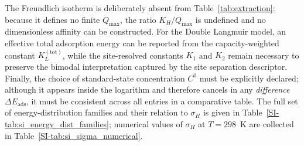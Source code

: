 \documentclass[journal=jacsat,manuscript=article]{achemso}
\begin{document}
	The Freundlich isotherm is deliberately absent from Table~\ref{tab:extraction}: because it defines no finite $Q_{\max}$, the ratio $K_H/Q_{\max}$ is undefined and no dimensionless affinity can be constructed. For the Double Langmuir model, an effective total adsorption energy can be reported from the capacity-weighted constant $K_L^{\mathrm{(tot)}}$, while the site-resolved constants $K_1$ and $K_2$ remain necessary to preserve the bimodal interpretation captured by the site separation descriptor. Finally, the choice of standard-state concentration $C^{0}$ must be explicitly declared; although it appears inside the logarithm and therefore cancels in any \emph{difference} $\Delta E_{\mathrm{ads}}$, it must be consistent across all entries in a comparative table. The full set of energy-distribution families and their relation to $\sigma_H$ is given in Table~\ref{SI-tab:si_energy_dist_families}; numerical values of $\sigma_H$ at $T = 298$~K are collected in Table~\ref{SI-tab:si_sigma_numerical}.
\end{document}

